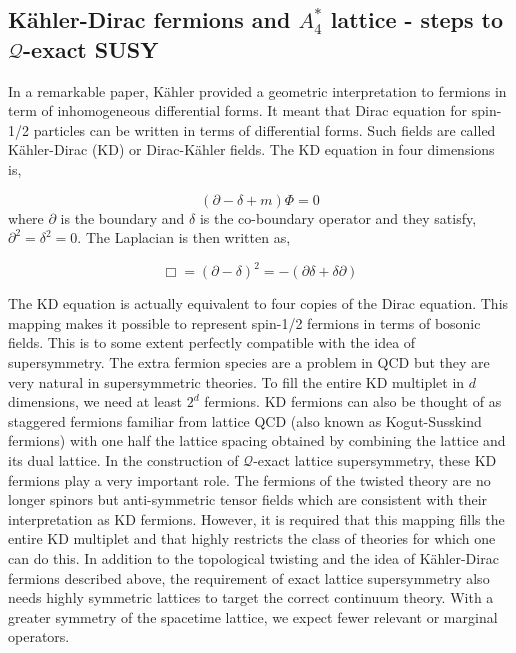 \subsection{K\"{a}hler-Dirac fermions and $A_{4}^{*}$ lattice - steps to $\mathcal{Q}$-exact SUSY} 

In a remarkable paper, K\"{a}hler provided a geometric interpretation to fermions in term of inhomogeneous differential forms. 
It meant that Dirac equation for spin-1/2 particles can be written in terms of differential forms. Such fields are called
K\"{a}hler-Dirac (KD) or Dirac-K\"{a}hler fields. The KD equation in four dimensions is, 

\begin{equation}
(\partial - \delta + m) \Phi = 0 
\end{equation}
where $\partial$ is the boundary and $\delta$ is the co-boundary operator and they satisfy, $\partial^2 = \delta^2 = 0$. The Laplacian is then written as,

\begin{equation}
\Box = (\partial - \delta)^{2} = -(\partial \delta + \delta \partial)
\end{equation}

The KD equation is actually equivalent to four copies of the Dirac equation. This mapping makes it possible to represent 
spin-1/2 fermions in terms of bosonic fields. This is to some extent perfectly compatible with the idea of supersymmetry. 
The extra fermion species are a problem in QCD but they are very natural in supersymmetric theories. To fill the entire 
KD multiplet in $d$ dimensions, we need at least $2^d$ fermions. KD fermions can also be thought of as 
staggered fermions familiar from lattice QCD (also known as Kogut-Susskind fermions) with one 
half the lattice spacing obtained by combining the lattice and its dual lattice. 
In the construction of $\mathcal{Q}$-exact lattice supersymmetry, these KD fermions play a very important role. 
The fermions of the twisted theory are no longer spinors but anti-symmetric tensor fields which are consistent with 
their interpretation as KD fermions. However, it is required that this mapping fills the entire KD multiplet and that 
highly restricts the class of theories for which one can do this. In addition to the topological twisting 
and the idea of K\"{a}hler-Dirac fermions described above, the requirement of 
exact lattice supersymmetry also needs highly symmetric lattices to target the correct continuum theory. 
With a greater symmetry of the spacetime lattice, we expect fewer relevant or marginal operators.  

